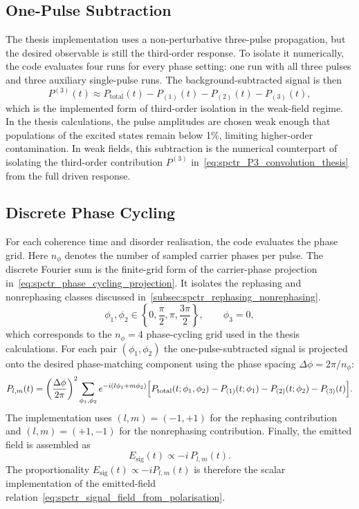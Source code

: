\subsection{One-Pulse Subtraction}
\label{app:sec:one_pulse_subtraction}
The thesis implementation uses a non-perturbative three-pulse propagation, but the desired observable is still the third-order response. To isolate it numerically, the code evaluates four runs for every phase setting: one run with all three pulses and three auxiliary single-pulse runs. The background-subtracted signal is then
\begin{equation*}
P^{(3)}(t)
\approx
P_{\mathrm{total}}(t)
- P_{(1)}(t)
- P_{(2)}(t)
- P_{(3)}(t),
\end{equation*}
which is the implemented form of third-order isolation in the weak-field regime. In the thesis calculations, the pulse amplitudes are chosen weak enough that populations of the excited states remain below 1\%, limiting higher-order contamination.
In weak fields, this subtraction is the numerical counterpart of isolating the third-order contribution \(P^{(3)}\) in~\autoref{eq:spctr_P3_convolution_thesis} from the full driven response.

\subsection{Discrete Phase Cycling}

For each coherence time and disorder realisation, the code evaluates the phase grid. Here \(n_{\phi}\) denotes the number of sampled carrier phases per pulse. The discrete Fourier sum is the finite-grid form of the carrier-phase projection in~\autoref{eq:spctr_phase_cycling_projection}. It isolates the rephasing and nonrephasing classes discussed in~\autoref{subsec:spctr_rephasing_nonrephasing}.
\begin{equation*}
\phi_1,\phi_2 \in \left\{0,\frac{\pi}{2},\pi,\frac{3\pi}{2}\right\},
\qquad
\phi_3 = 0,
\end{equation*}
which corresponds to the $n_{\phi}=4$ phase-cycling grid used in the thesis calculations. For each pair $(\phi_1,\phi_2)$ the one-pulse-subtracted signal is projected onto the desired phase-matching component using the phase spacing \(\Delta\phi=2\pi/n_{\phi}\):
\begin{equation*}
P_{l,m}(t)
=
\left(\frac{\Delta\phi}{2\pi}\right)^2
\sum_{\phi_1,\phi_2}
e^{-i(l\phi_1 + m\phi_2)}
\Bigl[
P_{\mathrm{total}}(t;\phi_1,\phi_2)
- P_{(1)}(t;\phi_1)
- P_{(2)}(t;\phi_2)
- P_{(3)}(t)
\Bigr].
\end{equation*}
The implementation uses $(l,m)=(-1,+1)$ for the rephasing contribution and $(l,m)=(+1,-1)$ for the nonrephasing contribution. Finally, the emitted field is assembled as
\begin{equation*}
E_{\mathrm{sig}}(t) \propto -i\,P_{l,m}(t).
\end{equation*}
The proportionality \(E_{\mathrm{sig}}(t)\propto -iP_{l,m}(t)\) is therefore the scalar implementation of the emitted-field relation~\autoref{eq:spctr_signal_field_from_polarisation}.

